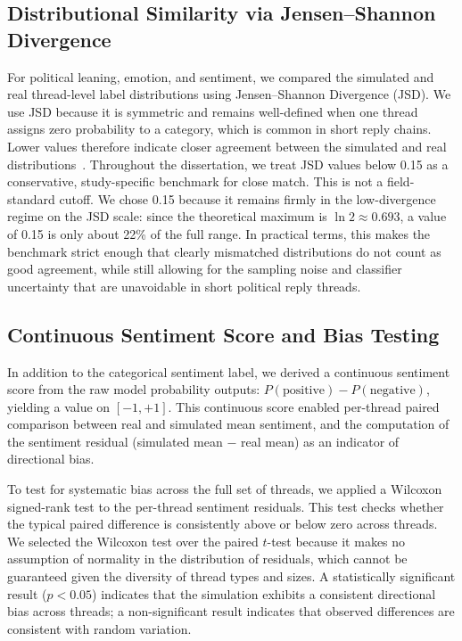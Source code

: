 \documentclass[logo,bsc,singlespacing,parskip,online]{infthesis}
\begin{document}
\subsection{Distributional Similarity via Jensen--Shannon Divergence}
\label{sec:jsd_method}

For political leaning, emotion, and sentiment, we compared the simulated and real thread-level label distributions using Jensen--Shannon Divergence (JSD). We use JSD because it is symmetric and remains well-defined when one thread assigns zero probability to a category, which is common in short reply chains. Lower values therefore indicate closer agreement between the simulated and real distributions~\citep{apellaniz2024synthetic}. Throughout the dissertation, we treat JSD values below 0.15 as a conservative, study-specific benchmark for close match. This is not a field-standard cutoff. We chose 0.15 because it remains firmly in the low-divergence regime on the JSD scale: since the theoretical maximum is $\ln 2 \approx 0.693$, a value of 0.15 is only about 22\% of the full range. In practical terms, this makes the benchmark strict enough that clearly mismatched distributions do not count as good agreement, while still allowing for the sampling noise and classifier uncertainty that are unavoidable in short political reply threads.

\subsection{Continuous Sentiment Score and Bias Testing}

In addition to the categorical sentiment label, we derived a continuous sentiment score from the raw model probability outputs: $P(\text{positive}) - P(\text{negative})$, yielding a value on $[-1, +1]$. This continuous score enabled per-thread paired comparison between real and simulated mean sentiment, and the computation of the sentiment residual (simulated mean $-$ real mean) as an indicator of directional bias.

To test for systematic bias across the full set of threads, we applied a Wilcoxon signed-rank test to the per-thread sentiment residuals. This test checks whether the typical paired difference is consistently above or below zero across threads. We selected the Wilcoxon test over the paired $t$-test because it makes no assumption of normality in the distribution of residuals, which cannot be guaranteed given the diversity of thread types and sizes. A statistically significant result ($p < 0.05$) indicates that the simulation exhibits a consistent directional bias across threads; a non-significant result indicates that observed differences are consistent with random variation.
\end{document}
